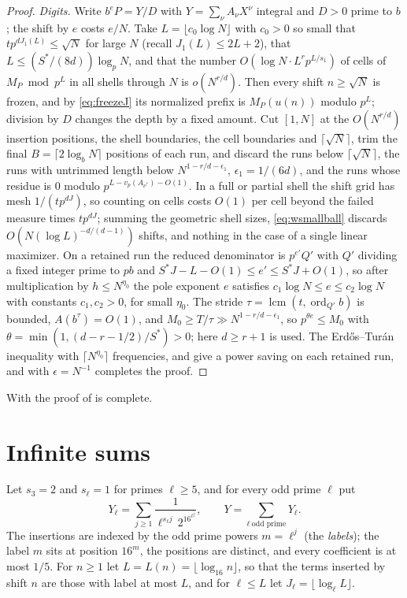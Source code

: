 \documentclass[11pt]{article}
\DeclareMathOperator{\ord}{ord}
\DeclareMathOperator{\lcm}{lcm}
\begin{document}
\begin{proof}
\emph{Digits.} Write $b^eP=Y/D$ with $Y=\sum_\nu A_\nu X^\nu$ integral and $D>0$ prime to $b$; the shift by $e$ costs $e/N$.
Take $L=\lfloor c_0\log N\rfloor$ with $c_0>0$ so small that $tp^{dJ_1(L)}\le\sqrt N$ for large $N$ (recall
$J_1(L)\le2L+2$), that $L\le(S^*/(8d))\log_pN$, and that the number $O(\log N\cdot L^rp^{L/s_1})$ of cells of
$M_P\bmod p^L$ in all shells through $N$ is $o(N^{r/d})$. Then every shift $n\ge\sqrt N$ is frozen, and by
\eqref{eq:freezeJ} its normalized prefix is $M_P(u(n))$ modulo $p^L$; division by $D$ changes the depth by a fixed
amount. Cut $[1,N]$ at the $O(N^{r/d})$ insertion positions, the shell boundaries, the cell boundaries and
$\lceil\sqrt N\rceil$, trim the final $B=\lceil2\log_bN\rceil$ positions of each run, and discard the runs below
$\lceil\sqrt N\rceil$, the runs with untrimmed length below $N^{1-r/d-\epsilon_1}$, $\epsilon_1=1/(6d)$, and the runs whose
residue is $0$ modulo $p^{L-v_p(A_{\nu^*})-O(1)}$. In a full or partial shell the shift grid has mesh
$1/(tp^{dJ})$, so counting on cells costs $O(1)$ per cell beyond the failed measure times $tp^{dJ}$; summing the
geometric shell sizes, \eqref{eq:wsmallball} discards $O(N(\log L)^{-d/(d-1)})$ shifts, and nothing in the case of a
single linear maximizer. On a retained run the reduced denominator is $p^{e'}Q'$ with $Q'$ dividing a fixed integer
prime to $pb$ and $S^*J-L-O(1)\le e'\le S^*J+O(1)$, so after multiplication by $h\le N^{\eta_0}$ the pole exponent
$e$ satisfies $c_1\log N\le e\le c_2\log N$ with constants $c_1,c_2>0$, for small $\eta_0$. The stride
$\tau=\lcm(t,\ord_{Q'}b)$ is bounded, $A(b^\tau)=O(1)$, and $M_0\ge T/\tau\gg N^{1-r/d-\epsilon_1}$, so
$p^{\theta e}\le M_0$ with $\theta=\min(1,(d-r-1/2)/S^*)>0$; here $d\ge r+1$ is used. The Erd\H{o}s--Tur\'an
inequality with $\lceil N^{\eta_0}\rceil$ frequencies,  and  give a power
saving on each retained run, and  with $\epsilon=N^{-1}$ completes the proof.
\end{proof}

With  the proof of  is complete.

\section{Infinite sums}\label{sec:sums}

Let $s_3=2$ and $s_\ell=1$ for primes $\ell\ge5$, and for every odd prime $\ell$ put
\[
Y_\ell=\sum_{j\ge1}\frac{1}{\ell^{s_\ell j}\,2^{16^{\ell^j}}},\qquad
Y=\sum_{\ell\ \text{odd prime}}Y_\ell .
\]
The insertions are indexed by the odd prime powers $m=\ell^j$ (the \emph{labels}); the label $m$ sits
at position $16^m$, the positions are distinct, and every coefficient is at most $1/5$. For $n\ge1$ let
$L=L(n)=\lfloor\log_{16}n\rfloor$, so that the terms inserted by shift $n$ are those with label at most
$L$, and for $\ell\le L$ let $J_\ell=\lfloor\log_\ell L\rfloor$.
\end{document}
